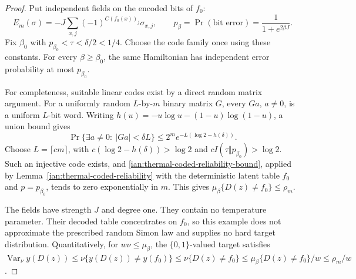 \begin{proof}
Put independent fields on the encoded bits of \(f_0\):
\[
 E_m(\sigma)=-J\sum_{x,j}
        (-1)^{C(f_0(x))_j}\sigma_{x,j},
 \qquad
 p_\beta=\Pr(\text{bit error})=\frac1{1+e^{2\beta J}} .
 \tag{38.15}
\]
Fix \(\beta_0\) with
\(p_{\beta_0}<\tau<\delta/2<1/4\).
Choose the code family once using these constants.
For every \(\beta\ge\beta_0\), the same Hamiltonian has independent
error probability at most \(p_{\beta_0}\).

For completeness, suitable linear codes exist by a direct random
matrix argument. For a uniformly random \(L\)-by-\(m\) binary
matrix \(G\), every \(Ga\), \(a\ne0\), is a uniform \(L\)-bit word.
Writing \(h(u)=-u\log u-(1-u)\log(1-u)\), a union bound gives
\[
 \Pr\{\exists a\ne0:\ |Ga|<\delta L\}
 \le 2^m e^{-L(\log2-h(\delta))}.
 \tag{38.16}
\]
Choose \(L=\lceil cm\rceil\), with
\(c(\log2-h(\delta))>\log2\) and
\(cI(\tau\Vert p_{\beta_0})>\log2\).
Such an injective code exists, and
\eqref{ian:thermal-coded-reliability-bound}, applied by
Lemma~\ref{ian:thermal-coded-reliability} with the deterministic
latent table \(f_0\) and \(p=p_{\beta_0}\), tends to zero
exponentially in \(m\). This gives
\(\mu_\beta\{D(z)\ne f_0\}\le\rho_m\).

The fields have strength \(J\) and degree one. They contain no
temperature parameter. Their decoded table concentrates on \(f_0\),
so this example does not approximate the prescribed random Simon
law and supplies no hard target distribution. Quantitatively, for
\(w\nu\le\mu_\beta\), the \(\{0,1\}\)-valued target satisfies
\(\operatorname{Var}_\nu y(D(z))
\le\nu\{y(D(z))\ne y(f_0)\}
\le\nu\{D(z)\ne f_0\}
\le\mu_\beta\{D(z)\ne f_0\}/w\le\rho_m/w\).
\end{proof}

